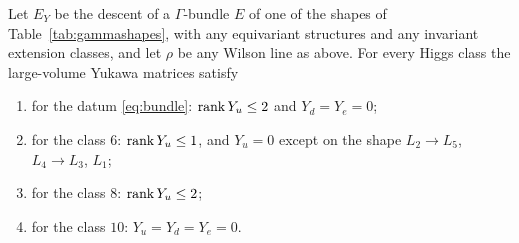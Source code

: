 \begin{theorem}\label{thm:gammayukawa}
Let $E_Y$ be the descent of a $\Gamma$-bundle $E$ of one of the shapes of
Table~\ref{tab:gammashapes}, with any equivariant structures and any
invariant extension classes, and let $\rho$ be any Wilson line as above.
For every Higgs class the large-volume Yukawa matrices satisfy
\begin{enumerate}[label=\textup{(\roman*)},leftmargin=*,itemsep=1pt]
\item for the datum \eqref{eq:bundle}: $\operatorname{rank} Y_u\le2$ and $Y_d=Y_e=0$;
\item for the class $6$: $\operatorname{rank} Y_u\le1$, and $Y_u=0$ except on the shape
$L_2\to L_5$, $L_4\to L_3$, $L_1$;
\item for the class $8$: $\operatorname{rank} Y_u\le2$;
\item for the class $10$: $Y_u=Y_d=Y_e=0$.
\end{enumerate}
\end{theorem}
